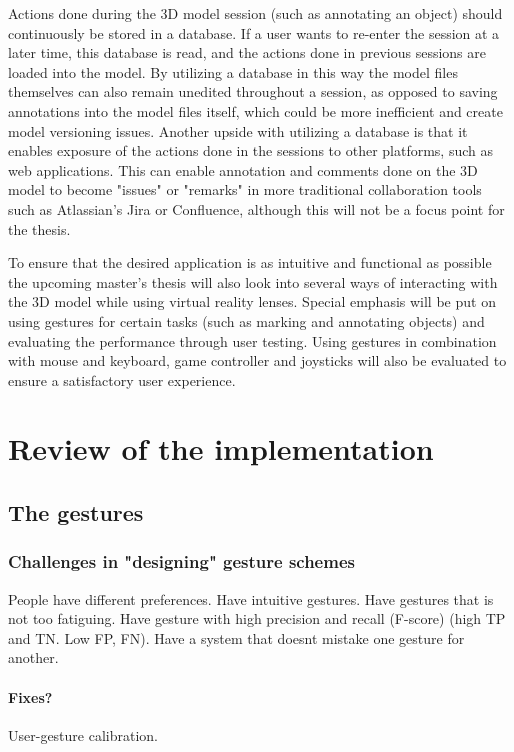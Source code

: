 \documentclass[UKenglish]{ifimaster}
\begin{document}
Actions done during the 3D model session (such as annotating an object) should continuously be stored in a database. If a user wants to re-enter the session at a later time, this database is read, and the actions done in previous sessions are loaded into the model. By utilizing a database 
in this way the model files themselves can also remain unedited throughout a session, as opposed to saving annotations into the model files itself, which could be more inefficient and create model versioning issues. Another upside with utilizing a database is that it enables exposure of the actions done in the sessions to other platforms, such as web applications. This can enable annotation and comments done on the 3D model to become "issues" or "remarks" in more traditional collaboration tools such as Atlassian's Jira or Confluence, although this will not be a focus point for the thesis.  

To ensure that the desired application is as intuitive and functional as possible the upcoming master's thesis will also look into several ways of interacting with the 3D model while using virtual reality lenses. Special emphasis will be put on using gestures for certain tasks (such as marking and annotating objects) and evaluating the performance through user testing. Using gestures in combination with mouse and keyboard, game controller and joysticks will also be evaluated to ensure a satisfactory user experience.     

\chapter{Review of the implementation}

\section{The gestures}
\subsection{Challenges in "designing" gesture schemes}
People have different preferences. Have intuitive gestures. Have gestures that is not too
fatiguing. Have gesture with high precision and recall (F-score) (high TP and TN. Low FP, FN).
Have a system that doesnt mistake one gesture for another.

\subsubsection{Fixes?}
User-gesture calibration. 
\end{document}
